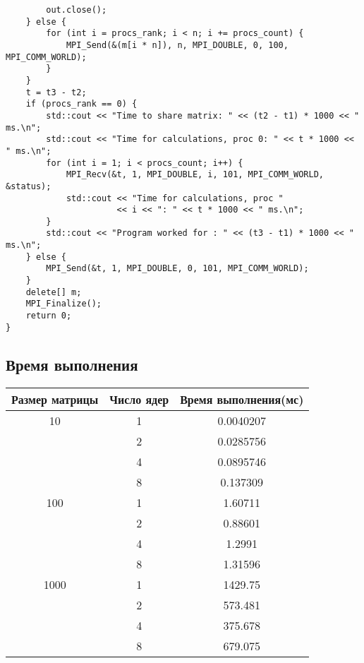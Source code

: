 \documentclass[10pt]{scrartcl}
\begin{document}
\begin{lstlisting}
        out.close();
    } else {
        for (int i = procs_rank; i < n; i += procs_count) {
            MPI_Send(&(m[i * n]), n, MPI_DOUBLE, 0, 100, MPI_COMM_WORLD);
        }
    }
    t = t3 - t2;
    if (procs_rank == 0) {
        std::cout << "Time to share matrix: " << (t2 - t1) * 1000 << " ms.\n";
        std::cout << "Time for calculations, proc 0: " << t * 1000 << " ms.\n";
        for (int i = 1; i < procs_count; i++) {
            MPI_Recv(&t, 1, MPI_DOUBLE, i, 101, MPI_COMM_WORLD, &status);
            std::cout << "Time for calculations, proc " 
                      << i << ": " << t * 1000 << " ms.\n";
        }
        std::cout << "Program worked for : " << (t3 - t1) * 1000 << " ms.\n";
    } else {
        MPI_Send(&t, 1, MPI_DOUBLE, 0, 101, MPI_COMM_WORLD);
    }
    delete[] m;
    MPI_Finalize();
    return 0;
}  
\end{lstlisting}
\subsection*{Время выполнения}
\begin{tabular}{|c|c|c|}
\hline
Размер матрицы & Число ядер & Время выполнения(мс) \\
\hline
10 & 1 & 0.0040207\\
\hline
& 2 & 0.0285756\\
\hline
& 4 & 0.0895746\\
\hline
& 8 & 0.137309\\
\hline
100 & 1 & 1.60711\\
\hline
& 2 & 0.88601\\
\hline
& 4 & 1.2991\\
\hline
& 8 & 1.31596\\
\hline
1000 & 1 & 1429.75\\
\hline
& 2 & 573.481\\
\hline
& 4 & 375.678\\
\hline
& 8 & 679.075\\
\hline
\end{tabular}
\end{document}
